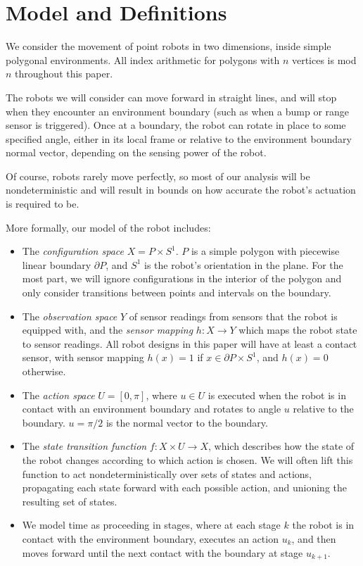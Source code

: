 \documentclass[]{styles/svproc}  %
\begin{document}
\section{Model and Definitions}

We consider the movement of point robots in two dimensions, inside simple polygonal
environments. All index arithmetic for polygons with $n$ vertices is mod $n$ 
throughout this paper.

The robots we will consider can move forward in straight lines, and will stop
when they encounter an environment boundary (such as when a bump or range
sensor is triggered). Once at a boundary, the robot can rotate in place to some
specified angle, either in its local frame or relative to the environment
boundary normal vector, depending on the sensing power of the robot.

Of course, robots rarely move perfectly, so most of our analysis will be
nondeterministic and will result in bounds on how accurate the robot's actuation
is required to be.

More formally, our model of the robot includes:

\begin{itemize}
\item The \emph{configuration space} $X = P \times S^1$. $P$ is a simple polygon with 
piecewise linear boundary $\partial P$, and $S^1$ is the robot's orientation in the plane. For the most part, we will ignore configurations in the interior
of the polygon and only consider transitions between points and intervals on the
boundary.
\item The \emph{observation space} $Y$ of sensor readings from sensors that the
robot is equipped with, and the \emph{sensor mapping} $h: X \to Y$ which maps
the robot state to sensor readings. All robot designs in this paper will have at
least a contact sensor, with sensor mapping $h(x) = 1$ if $x \in \partial
P \times S^1$, and $h(x) = 0$ otherwise.
\item The \emph{action space} $U = [0,\pi]$, where $u \in U$ is executed when
the robot is in contact with an environment boundary and rotates to angle $u$
relative to the boundary. $u = \pi/2$ is the normal vector to the boundary.
\item The \emph{state transition function} $f: X \times U \to X$, which
describes how the state of the robot changes according to which action is
chosen. We will often lift this function to act nondeterministically over sets
of states and actions, propagating each state forward with each possible action,
and unioning the resulting set of states.
\item We model time as proceeding in stages, where at each stage $k$ the robot
is in contact with the environment boundary, executes an action $u_k$, and then
moves forward until the next contact with the boundary at stage $u_{k+1}$.
\end{itemize}
\end{document}
